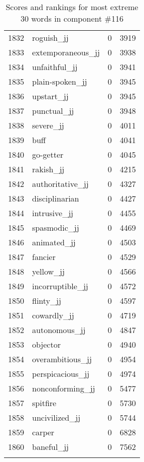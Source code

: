 \begin{longtable}[!htbp]{| rlr@{.}l |}
    1832 & roguish\_jj & 0 & 3919 \\
    1833 & extemporaneous\_jj & 0 & 3938 \\
    1834 & unfaithful\_jj & 0 & 3941 \\
    1835 & plain-spoken\_jj & 0 & 3945 \\
    1836 & upstart\_jj & 0 & 3945 \\
    1837 & punctual\_jj & 0 & 3948 \\
    1838 & severe\_jj & 0 & 4011 \\
    1839 & buff & 0 & 4041 \\
    1840 & go-getter & 0 & 4045 \\
    1841 & rakish\_jj & 0 & 4215 \\
    1842 & authoritative\_jj & 0 & 4327 \\
    1843 & disciplinarian & 0 & 4427 \\
    1844 & intrusive\_jj & 0 & 4455 \\
    1845 & spasmodic\_jj & 0 & 4469 \\
    1846 & animated\_jj & 0 & 4503 \\
    1847 & fancier & 0 & 4529 \\
    1848 & yellow\_jj & 0 & 4566 \\
    1849 & incorruptible\_jj & 0 & 4572 \\
    1850 & flinty\_jj & 0 & 4597 \\
    1851 & cowardly\_jj & 0 & 4719 \\
    1852 & autonomous\_jj & 0 & 4847 \\
    1853 & objector & 0 & 4940 \\
    1854 & overambitious\_jj & 0 & 4954 \\
    1855 & perspicacious\_jj & 0 & 4974 \\
    1856 & nonconforming\_jj & 0 & 5477 \\
    1857 & spitfire & 0 & 5730 \\
    1858 & uncivilized\_jj & 0 & 5744 \\
    1859 & carper & 0 & 6828 \\
    1860 & baneful\_jj & 0 & 7562 \\
    \hline
    \caption{Scores and rankings for most extreme 30 words in component \#116} \\
\end{longtable}
